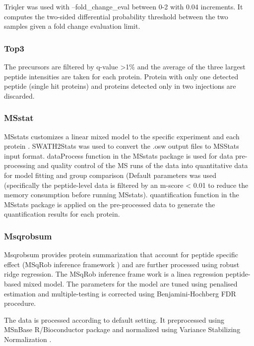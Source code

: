 \documentclass[10pt,letterpaper]{article}
\begin{document}
Triqler was used with --fold\_change\_eval between 0-2 with 0.04 increments. It computes the two-sided differential probability threshold between the two samples given a fold change evaluation limit. 

\subsubsection*{Top3}
The precursors are filtered by q-value \textgreater 1\% and the average of the three largest peptide intensities are taken for each protein. Protein with only one detected peptide (single hit proteins) and proteins detected only in two injections are discarded.

\subsubsection*{MSstat}
 MSstats customizes a linear mixed model to the specific experiment and each protein \cite{choi2014msstats}. SWATH2Stats was used to convert the .osw output files to MSStats input format. dataProcess function in the MSstats package is used for data pre-processing and quality control of the MS runs of the data into quantitative data for model fitting and group comparison (Default parameters was used (specifically the peptide-level data is filtered by an m-score < 0.01 to reduce the memory consumption before running MSstats). quantification function in the MSstats package is applied on the pre-processed data to generate the quantification results for each protein.  

\subsubsection*{Msqrobsum}
Msqrobsum provides protein summarization that account for peptide specific effect (MSqRob inference framework \cite{goeminne2020msqrob}) and are further processed using robust ridge regression. The MSqRob inference frame work is a linea regression peptide-based mixed model. The parameters for the model are tuned using penalised estimation and multiple-testing is corrected using Benjamini-Hochberg FDR procedure. 

The data is processed according to default setting. It preprocessed using MSnBase R/Bioconductor package \cite{gatto2012msnbase} and normalized using Variance Stabilizing Normalization \cite{von2002variance}. 


\end{document}
